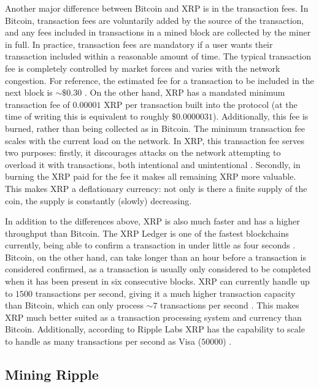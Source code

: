 \documentclass[11pt,a4paper]{article}
\begin{document}
	Another major difference between Bitcoin and XRP is in the transaction fees. In Bitcoin, transaction fees are voluntarily added by the source of the transaction, and any fees included in transactions in a mined block are collected by the miner in full. In practice, transaction fees are mandatory if a user wants their transaction included within a reasonable amount of time. The typical transaction fee is completely controlled by market forces and varies with the network congestion. For reference, the estimated fee for a transaction to be included in the next block is $\sim\$0.30$ \cite{bitcoinfees}. On the other hand, XRP has a mandated minimum transaction fee of $0.00001$ XRP per transaction built into the protocol (at the time of writing this is equivalent to roughly $\$0.0000031$). Additionally, this fee is burned, rather than being collected as in Bitcoin. The minimum transaction fee scales with the current load on the network. In XRP, this transaction fee serves two purposes: firstly, it discourages attacks on the network attempting to overload it with transactions, both intentional and unintentional \cite{}. Secondly, in burning the XRP paid for the fee it makes all remaining XRP more valuable. This makes XRP a deflationary currency: not only is there a finite supply of the coin, the supply is constantly (slowly) decreasing.
	
	In addition to the differences above, XRP is also much faster and has a higher throughput than Bitcoin. The XRP Ledger is one of the fastest blockchains currently, being able to confirm a transaction in under little as four seconds \cite{investinblockchain}. Bitcoin, on the other hand, can take longer than an hour before a transaction is considered confirmed, as a transaction is usually only considered to be completed when it has been present in six consecutive blocks. XRP can currently handle up to $1500$ transactions per second, giving it a much higher transaction capacity than Bitcoin, which can only process $\sim7$ transactions per second \cite{blocksplain}. This makes XRP much better suited as a transaction processing system and currency than Bitcoin. Additionally, according to Ripple Labs XRP has the capability to scale to handle as many transactions per second as Visa ($50000$) \cite{ripple}.
	
	\subsection{Mining Ripple}
	
\end{document}
